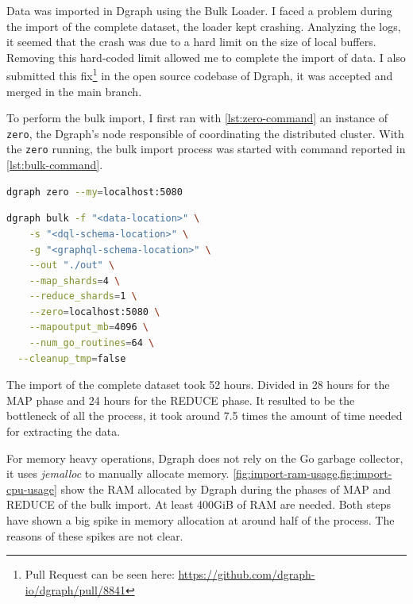 Data was imported in Dgraph using the Bulk Loader. I faced a problem during the import of the complete dataset, the loader kept crashing. Analyzing the logs, it seemed that the crash was due to a hard limit on the size of local buffers. Removing this hard-coded limit allowed me to complete the import of data. I also submitted this fix\footnote{Pull Request can be seen here: \url{https://github.com/dgraph-io/dgraph/pull/8841}} in the open source codebase of Dgraph, it was accepted and merged in the main branch.

To perform the bulk import, I first ran with \cref{lst:zero-command} an instance of {\tt zero}, the Dgraph's node responsible of coordinating the distributed cluster. With the {\tt zero} running, the bulk import process was started with command reported in \cref{lst:bulk-command}.

\begin{lstlisting}[language=Bash,caption={Command used for running {\tt zero}.},label={lst:zero-command},captionpos=b,numbers=none]
    dgraph zero --my=localhost:5080
\end{lstlisting}

\begin{lstlisting}[language=Bash,caption={Command used for running {\tt bulk loader}.},label={lst:bulk-command},captionpos=b,numbers=none]
dgraph bulk -f "<data-location>" \
	-s "<dql-schema-location>" \
	-g "<graphql-schema-location>" \
	--out "./out" \
	--map_shards=4 \
	--reduce_shards=1 \
	--zero=localhost:5080 \
	--mapoutput_mb=4096 \
	--num_go_routines=64 \
  --cleanup_tmp=false
\end{lstlisting}

The import of the complete dataset took 52 hours. Divided in 28 hours for the MAP phase and 24 hours for the REDUCE phase. It resulted to be the bottleneck of all the process, it took around 7.5 times the amount of time needed for extracting the data. 

For memory heavy operations, Dgraph does not rely on the Go garbage collector, it uses \textit{jemalloc} to manually allocate memory. \cref{fig:import-ram-usage,fig:import-cpu-usage} show the RAM allocated by Dgraph during the phases of MAP and REDUCE of the bulk import. At least 400GiB of RAM are needed. Both steps have shown a big spike in memory allocation at around half of the process. The reasons of these spikes are not clear.

